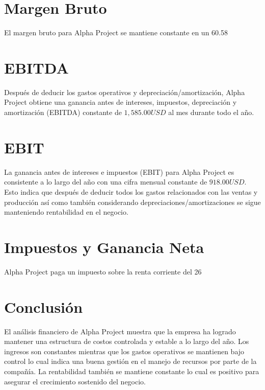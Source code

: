 \section{Margen Bruto}
El margen bruto para Alpha Project se mantiene constante en un 60.58%

\section{EBITDA}
Después de deducir los gastos operativos y depreciación/amortización, Alpha Project obtiene una ganancia antes de intereses, impuestos, depreciación y amortización (EBITDA) constante de $1,585.00 USD$ al mes durante todo el año.

\section{EBIT}
La ganancia antes de intereses e impuestos (EBIT) para Alpha Project es consistente a lo largo del año con una cifra mensual constante de $918.00 USD$. Esto indica que después de deducir todos los gastos relacionados con las ventas y producción así como también considerando depreciaciones/amortizaciones se sigue manteniendo rentabilidad en el negocio.

\section{Impuestos y Ganancia Neta}
Alpha Project paga un impuesto sobre la renta corriente del 26%

\section{Conclusión}
El análisis financiero de Alpha Project muestra que la empresa ha logrado mantener una estructura de costos controlada y estable a lo largo del año. Los ingresos son constantes mientras que los gastos operativos se mantienen bajo control lo cual indica una buena gestión en el manejo de recursos por parte de la compañía. La rentabilidad también se mantiene constante lo cual es positivo para asegurar el crecimiento sostenido del negocio.